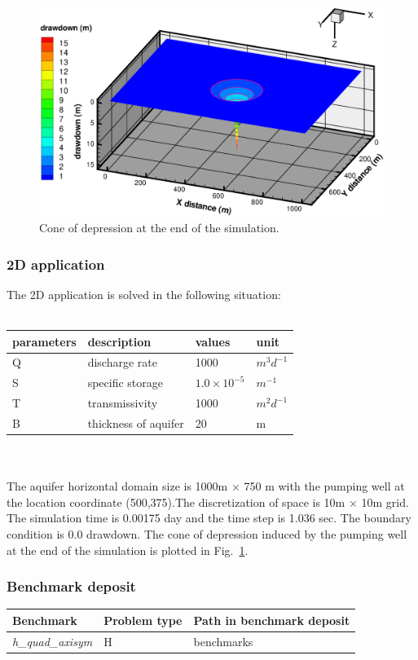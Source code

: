 %
\begin{figure} [htb!]
 \centering
 \includegraphics[width=0.9\columnwidth] {H_GW/figures/theis2.eps}
 \caption{Cone of depression at the end of the simulation.}
 \label{theis2}
\end{figure}
%
%
\subsubsection*{2D application}
%
The 2D application is solved in the following situation:\\
\\
%
\begin{tabular}{|l|l|l||l|}
  \hline
  parameters& description & values & unit \\
  \hline
  Q & discharge rate & 1000  & $m^{3}d^{-1}$  \\
  S & specific storage & $1.0\times 10^{-5}$ & $m^{-1}$ \\
  T & transmissivity & 1000 &  $m^{2}d^{-1}$ \\
  B & thickness of aquifer & 20 & m \\
  \hline
\end{tabular}
\\
\\
The aquifer horizontal domain size is 1000m $\times$ 750 m with the pumping well at the location coordinate (500,375).The discretization of space is 10m $\times$ 10m grid. The simulation time is 0.00175 day and the time step is 1.036 sec. The boundary condition is 0.0 drawdown.
The cone of depression induced by the pumping well at the end of the simulation is plotted in Fig.~\ref{theis2}.
\subsubsection*{Benchmark deposit}
%
\begin{tabular}{|l|l|l|}
  \hline
  Benchmark & Problem type & Path in benchmark deposit \\
  \hline
  \emph{h\_quad\_axisym} & H & benchmarks\verb \H\Theis_2D\ \\
  \hline
\end{tabular}
%

